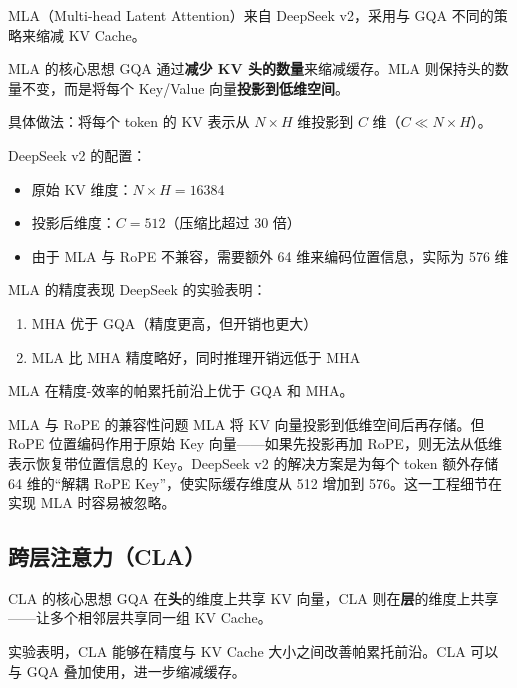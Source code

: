 \documentclass[a4paper]{article}
\begin{document}
MLA（Multi-head Latent Attention）来自 DeepSeek v2，采用与 GQA 不同的策略来缩减 KV Cache。

\begin{importantbox}{MLA 的核心思想}
GQA 通过\textbf{减少 KV 头的数量}来缩减缓存。MLA 则保持头的数量不变，而是将每个 Key/Value 向量\textbf{投影到低维空间}。

具体做法：将每个 token 的 KV 表示从 $N \times H$ 维投影到 $C$ 维（$C \ll N \times H$）。
\end{importantbox}

DeepSeek v2 的配置：
\begin{itemize}
    \item 原始 KV 维度：$N \times H = 16384$
    \item 投影后维度：$C = 512$（压缩比超过 30 倍）
    \item 由于 MLA 与 RoPE 不兼容，需要额外 64 维来编码位置信息，实际为 576 维
\end{itemize}

\begin{knowledgebox}{MLA 的精度表现}
DeepSeek 的实验表明：
\begin{enumerate}
    \item MHA 优于 GQA（精度更高，但开销也更大）
    \item MLA 比 MHA 精度略好，同时推理开销远低于 MHA
\end{enumerate}
MLA 在精度-效率的帕累托前沿上优于 GQA 和 MHA。
\end{knowledgebox}

\begin{warningbox}{MLA 与 RoPE 的兼容性问题}
MLA 将 KV 向量投影到低维空间后再存储。但 RoPE 位置编码作用于原始 Key 向量——如果先投影再加 RoPE，则无法从低维表示恢复带位置信息的 Key。DeepSeek v2 的解决方案是为每个 token 额外存储 64 维的``解耦 RoPE Key''，使实际缓存维度从 512 增加到 576。这一工程细节在实现 MLA 时容易被忽略。
\end{warningbox}

\subsection{跨层注意力（CLA）}

\begin{importantbox}{CLA 的核心思想}
GQA 在\textbf{头}的维度上共享 KV 向量，CLA 则在\textbf{层}的维度上共享——让多个相邻层共享同一组 KV Cache。
\end{importantbox}

实验表明，CLA 能够在精度与 KV Cache 大小之间改善帕累托前沿。CLA 可以与 GQA 叠加使用，进一步缩减缓存。
\end{document}

